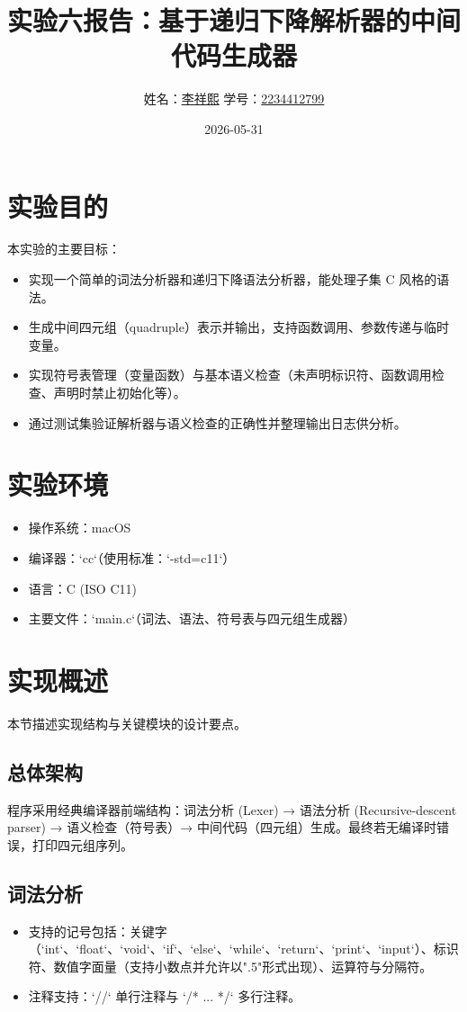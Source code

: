\documentclass[12pt,a4paper]{ctexart}
\title{实验六报告：基于递归下降解析器的中间代码生成器}
\author{姓名：\underline{李祥熙} \quad 学号：\underline{2234412799}}
\date{2026-05-31}
\begin{document}
\maketitle
\tableofcontents
\newpage

\section{实验目的}
本实验的主要目标：
\begin{itemize}
	\item 实现一个简单的词法分析器和递归下降语法分析器，能处理子集 C 风格的语法。
	\item 生成中间四元组（quadruple）表示并输出，支持函数调用、参数传递与临时变量。
	\item 实现符号表管理（变量\/函数）与基本语义检查（未声明标识符、函数调用检查、声明时禁止初始化等）。
	\item 通过测试集验证解析器与语义检查的正确性并整理输出日志供分析。
\end{itemize}

\section{实验环境}
\begin{itemize}
	\item 操作系统：macOS
	\item 编译器：`cc`（使用标准：`-std=c11`）
	\item 语言：C (ISO C11)
	\item 主要文件：`main.c`（词法、语法、符号表与四元组生成器）
\end{itemize}

\section{实现概述}
本节描述实现结构与关键模块的设计要点。

\subsection{总体架构}
程序采用经典编译器前端结构：词法分析 (Lexer) → 语法分析 (Recursive-descent parser) → 语义检查（符号表）→ 中间代码（四元组）生成。最终若无编译时错误，打印四元组序列。

\subsection{词法分析}
\begin{itemize}
	\item 支持的记号包括：关键字（`int`、`float`、`void`、`if`、`else`、`while`、`return`、`print`、`input`）、标识符、数值字面量（支持小数点并允许以".5"形式出现）、运算符与分隔符。
	\item 注释支持：`//` 单行注释与 `/* ... */` 多行注释。
\end{itemize}
\end{document}
